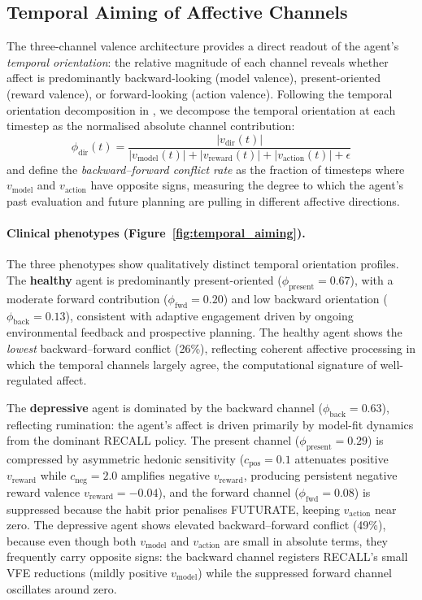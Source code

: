\documentclass[11pt,a4paper]{article}
\begin{document}
\subsection{Temporal Aiming of Affective Channels}

The three-channel valence architecture provides a direct readout of the agent's \emph{temporal orientation}: the relative magnitude of each channel reveals whether affect is predominantly backward-looking (model valence), present-oriented (reward valence), or forward-looking (action valence). Following the temporal orientation decomposition in \citet{albarracin2026temporal}, we decompose the temporal orientation at each timestep as the normalised absolute channel contribution:
\begin{equation}
    \phi_{\text{dir}}(t) = \frac{|v_{\text{dir}}(t)|}{|v_{\text{model}}(t)| + |v_{\text{reward}}(t)| + |v_{\text{action}}(t)| + \epsilon}
\end{equation}
and define the \emph{backward--forward conflict rate} as the fraction of timesteps where $v_{\text{model}}$ and $v_{\text{action}}$ have opposite signs, measuring the degree to which the agent's past evaluation and future planning are pulling in different affective directions.

\paragraph{Clinical phenotypes (Figure~\ref{fig:temporal_aiming}).} The three phenotypes show qualitatively distinct temporal orientation profiles. The \textbf{healthy} agent is predominantly present-oriented ($\phi_{\text{present}} = 0.67$), with a moderate forward contribution ($\phi_{\text{fwd}} = 0.20$) and low backward orientation ($\phi_{\text{back}} = 0.13$), consistent with adaptive engagement driven by ongoing environmental feedback and prospective planning. The healthy agent shows the \emph{lowest} backward--forward conflict (26\%), reflecting coherent affective processing in which the temporal channels largely agree, the computational signature of well-regulated affect.

The \textbf{depressive} agent is dominated by the backward channel ($\phi_{\text{back}} = 0.63$), reflecting rumination: the agent's affect is driven primarily by model-fit dynamics from the dominant RECALL policy. The present channel ($\phi_{\text{present}} = 0.29$) is compressed by asymmetric hedonic sensitivity ($c_{\text{pos}} = 0.1$ attenuates positive $v_{\text{reward}}$ while $c_{\text{neg}} = 2.0$ amplifies negative $v_{\text{reward}}$, producing persistent negative reward valence $v_{\text{reward}} = -0.04$), and the forward channel ($\phi_{\text{fwd}} = 0.08$) is suppressed because the habit prior penalises FUTURATE, keeping $v_{\text{action}}$ near zero. The depressive agent shows elevated backward--forward conflict (49\%), because even though both $v_{\text{model}}$ and $v_{\text{action}}$ are small in absolute terms, they frequently carry opposite signs: the backward channel registers RECALL's small VFE reductions (mildly positive $v_{\text{model}}$) while the suppressed forward channel oscillates around zero.
\end{document}
